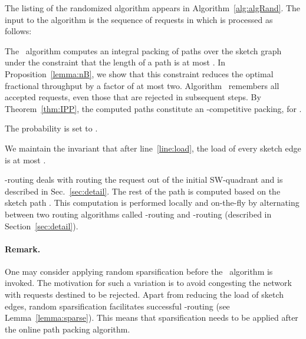 \documentclass[11pt]{article}
\newcommand{\route}{\text{\sc{ipp}}}
\newcommand{\IPP}{\route}
\newenvironment{proof sketch}[1]{\noindent {\emph{Proof sketch of #1:}}}{\hfill \qed}
\begin{document}
The listing of the randomized algorithm appears in
Algorithm~\ref{alg:algRand}.
The input to the algorithm is the sequence of requests in  which is processed as follows:
\begin{inparaenum}[(1)]
\item The \route\ algorithm computes an integral packing of paths over the sketch graph 
  under the constraint that the length of a path is at most
  . In Proposition~\ref{lemma:nB}, we show that this
  constraint reduces the optimal fractional throughput by a factor of
  at most two. Algorithm \IPP\ remembers all accepted requests, even
  those that are rejected in subsequent steps. By
  Theorem~\ref{thm:IPP}, the computed paths constitute an
  -competitive packing, for .
\item The probability  is set to .
\item We maintain the invariant that after line~\ref{line:load}, the
  load of every sketch edge is at most .
\item -routing deals with routing the request out of the initial
  SW-quadrant and is described in Sec.~\ref{sec:detail}.  The rest of
  the path is computed based on the sketch path . This
  computation is performed locally and on-the-fly by alternating between two routing
  algorithms called -routing and -routing (described in
  Section~\ref{sec:detail}).
\end{inparaenum}

\paragraph{Remark.}
One may consider applying random sparsification before the \route\ algorithm is
  invoked. The motivation for such a variation is to avoid congesting the network
  with requests destined to be rejected. Apart from reducing the load of sketch
  edges, random sparsification facilitates successful -routing (see
  Lemma~\ref{lemma:sparse}). This means that sparsification needs to be applied after
  the online path packing algorithm.
\end{document}
